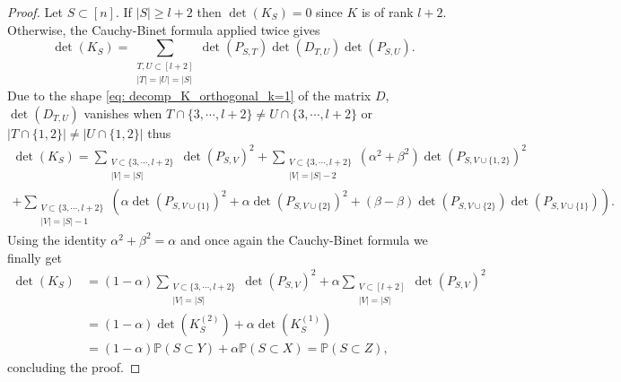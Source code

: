 \documentclass{article}
\numberwithin{equation}{section}
\renewcommand{\geq}{\geqslant}
\theoremstyle{plain}
\begin{document}
\begin{proof}
Let $S\subset [n]$. If $|S|\geq l+2$ then $\det(K_S)=0$ since $K$ is of rank $l+2$. Otherwise, the Cauchy-Binet formula applied twice gives
\[\det(K_S)=\sum_{\substack{T, U\subset [l+2]\\ |T|=|U|=|S|}}\det(P_{S, T})\det(D_{T, U})\det(P_{S, U}).\]
Due to the shape \eqref{eq: decomp_K_orthogonal_k=1} of the matrix $D$, $\det(D_{T, U})$ vanishes when $T\cap\{3,\cdots,l+2\}\neq U\cap\{3,\cdots,l+2\}$ or $|T\cap\{1, 2\}|\neq|U\cap\{1, 2\}|$ thus
\begin{multline*}
\det(K_S)=\sum_{\substack{V\subset \{3,\cdots,l+2\}\\ |V|=|S|}}\det(P_{S, V})^2 + \sum_{\substack{V\subset \{3,\cdots,l+2\}\\ |V|=|S|-2}}(\alpha^2+\beta^2)\det(P_{S, V\cup\{1, 2\}})^2\\
+ \sum_{\substack{V\subset \{3,\cdots,l+2\}\\ |V|=|S|-1}}\left(\alpha\det(P_{S, V\cup\{1\}})^2 + \alpha\det(P_{S, V\cup\{2\}})^2+ (\beta-\beta)\det(P_{S, V\cup\{2\}})\det(P_{S, V\cup\{1\}})\right).
\end{multline*}
Using the identity $\alpha^2+\beta^2=\alpha$ and once again the Cauchy-Binet formula we finally get
\begin{align*}
\det(K_S)&=(1-\alpha)\sum_{\substack{V\subset \{3,\cdots,l+2\}\\ |V|=|S|}}\det(P_{S, V})^2 + \alpha\sum_{\substack{V\subset [l+2]\\ |V|=|S|}}\det(P_{S, V})^2\\
&=(1-\alpha)\det(K^{(2)}_{S}) + \alpha\det(K^{(1)}_{S})\\
&=(1-\alpha)\mathbb{P}(S\subset Y) + \alpha\mathbb{P}(S\subset X) = \mathbb{P}(S\subset Z),
\end{align*}
concluding the proof.
\end{proof}
\end{document}
